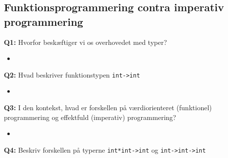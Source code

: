 \documentclass[rgb]{beamer}
\begin{document}
\popmaketitleframe

\subsection{Funktionsprogrammering contra imperativ programmering}

\begin{frame}[fragile]
\begin{footnotesize}


  \vspace{2mm}
  \textbf{Q1:} Hvorfor beskæftiger vi os overhovedet med typer?
  \vspace{1mm}

  \begin{itemize}
  \item \underline{\hspace{10cm}}
  \end{itemize}

  \vspace{2mm}
  \textbf{Q2:} Hvad beskriver funktionstypen \lstinline{int->int}
  \vspace{1mm}

  \begin{itemize}
  \item \underline{\hspace{10cm}}
  \end{itemize}

  \vspace{2mm}
  \textbf{Q3:} I den kontekst, hvad er forskellen på værdiorienteret (funktionel) programmering og effektfuld (imperativ) programmering?
  \vspace{1mm}

  \begin{itemize}
  \item \underline{\hspace{10cm}}
  \end{itemize}

  \vspace{2mm}
  \textbf{Q4:} Beskriv forskellen på typerne \lstinline{int*int->int} og \lstinline{int->int->int}
  \vspace{1mm}


\end{footnotesize}
\end{frame}
\end{document}
